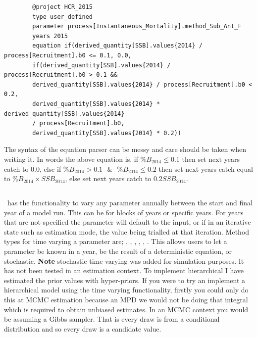 \pagebreak
{\small{\begin{verbatim}
		@project HCR_2015
		type user_defined
		parameter process[Instantaneous_Mortality].method_Sub_Ant_F
		years 2015 
		equation if(derived_quantity[SSB].values{2014} / process[Recruitment].b0 <= 0.1, 0.0,
		if(derived_quantity[SSB].values{2014} / process[Recruitment].b0 > 0.1 && 
		derived_quantity[SSB].values{2014} / process[Recruitment].b0 < 0.2,
		derived_quantity[SSB].values{2014} * derived_quantity[SSB].values{2014}  
		/ process[Recruitment].b0,
		derived_quantity[SSB].values{2014} * 0.2))
		\end{verbatim}}}

The syntax of the equation parser can be messy and care should be taken when writing it. In words the above equation is, if $\%B_{2014} \leq 0.1$ then set next years catch to 0.0, else if $\%B_{2014} > 0.1 \text{ } \& \text{ } \%B_{2014} \leq 0.2$ then set next years catch equal to $\%B_{2014} \times SSB_{2014}$, else set next years catch to $0.2 SSB_{2014}$.

\subsection{\label{sec:time_var}}

\CNAME\ has the functionality to vary any parameter annually between the start and final year of a model run. This can be for blocks of years or specific years. For years that are not specified the parameter will default to the input, or if in an iterative state such as estimation mode, the value being trialled at that iteration. Method types for time varying a parameter are; , , , , , . This allows users to let a parameter be known in a year, be the result of a deterministic equation, or stochastic. \textbf{Note} stochastic time varying was added for simulation purposes. It has not been tested in an estimation context. To implement hierarchical I have estimated the prior values with hyper-priors. If you were to try an implement a hierarchical model using the time varying functionality, firstly you could only do this at MCMC estimation because an MPD we would not be doing that integral which is required to obtain unbiased estimates. In an MCMC context you would be assuming a Gibbs sampler. That is every draw is from a conditional distribution and so every draw is a candidate value.

